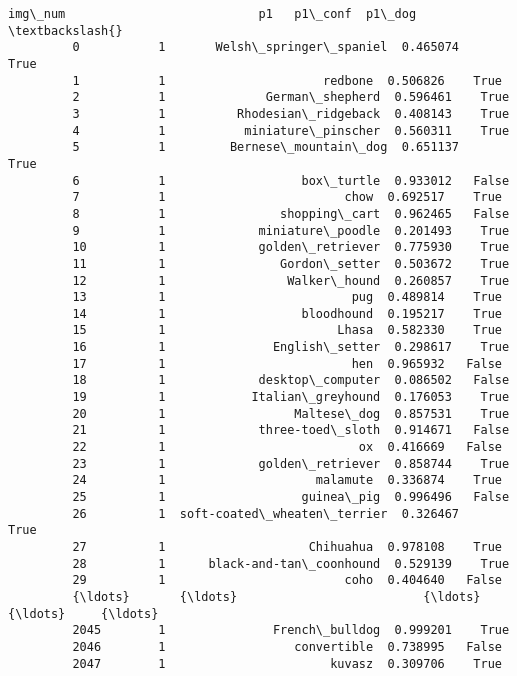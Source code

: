 \documentclass[11pt]{article}
\begin{document}
\begin{Verbatim}[commandchars=\\\{\}]
               img\_num                           p1   p1\_conf  p1\_dog  \textbackslash{}
         0           1       Welsh\_springer\_spaniel  0.465074    True   
         1           1                      redbone  0.506826    True   
         2           1              German\_shepherd  0.596461    True   
         3           1          Rhodesian\_ridgeback  0.408143    True   
         4           1           miniature\_pinscher  0.560311    True   
         5           1         Bernese\_mountain\_dog  0.651137    True   
         6           1                   box\_turtle  0.933012   False   
         7           1                         chow  0.692517    True   
         8           1                shopping\_cart  0.962465   False   
         9           1             miniature\_poodle  0.201493    True   
         10          1             golden\_retriever  0.775930    True   
         11          1                Gordon\_setter  0.503672    True   
         12          1                 Walker\_hound  0.260857    True   
         13          1                          pug  0.489814    True   
         14          1                   bloodhound  0.195217    True   
         15          1                        Lhasa  0.582330    True   
         16          1               English\_setter  0.298617    True   
         17          1                          hen  0.965932   False   
         18          1             desktop\_computer  0.086502   False   
         19          1            Italian\_greyhound  0.176053    True   
         20          1                  Maltese\_dog  0.857531    True   
         21          1             three-toed\_sloth  0.914671   False   
         22          1                           ox  0.416669   False   
         23          1             golden\_retriever  0.858744    True   
         24          1                     malamute  0.336874    True   
         25          1                   guinea\_pig  0.996496   False   
         26          1  soft-coated\_wheaten\_terrier  0.326467    True   
         27          1                    Chihuahua  0.978108    True   
         28          1      black-and-tan\_coonhound  0.529139    True   
         29          1                         coho  0.404640   False   
         {\ldots}       {\ldots}                          {\ldots}       {\ldots}     {\ldots}   
         2045        1               French\_bulldog  0.999201    True   
         2046        1                  convertible  0.738995   False   
         2047        1                       kuvasz  0.309706    True   

\end{Verbatim}
\end{document}
